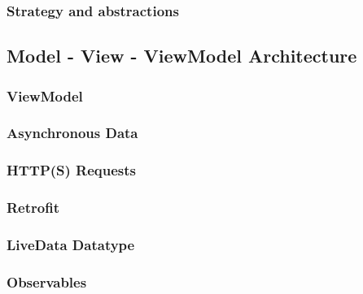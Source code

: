 \subsubsection{Strategy and abstractions}
\subsection{Model - View - ViewModel Architecture}
\subsubsection{ViewModel}
\subsubsection{Asynchronous Data}
\subsubsection{HTTP(S) Requests}
\subsubsection{Retrofit}
\subsubsection{LiveData Datatype}
\subsubsection{Observables}